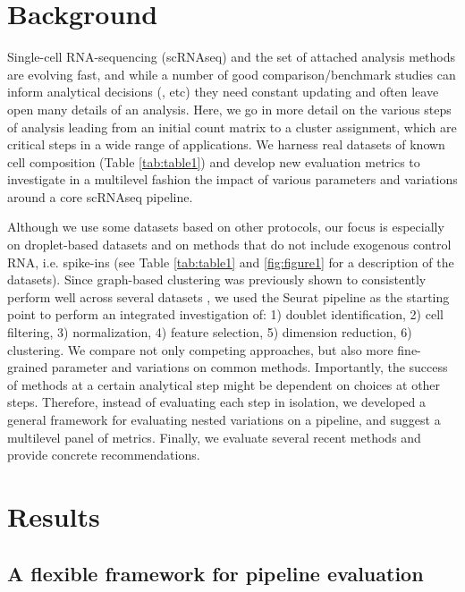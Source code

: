 \documentclass{bmcart}
\begin{document}

\section*{Background}

Single-cell RNA-sequencing (scRNAseq) and the set of attached analysis methods are evolving fast, and while a number of good comparison/benchmark studies can inform analytical decisions (\citealp{duoClustering2018}, etc) they need constant updating and often leave open many details of an analysis. Here, we go in more detail on the various steps of analysis leading from an initial count matrix to a cluster assignment, which are critical steps in a wide range of applications. We harness real datasets of known cell composition (Table \ref{tab:table1}) and develop new evaluation metrics to investigate in a multilevel fashion the impact of various parameters and variations around a core scRNAseq pipeline.

Although we use some datasets based on other protocols, our focus is especially on droplet-based datasets and on methods that do not include exogenous control RNA, i.e. spike-ins (see Table \ref{tab:table1} and \ref{fig:figure1} for a description of the datasets). Since graph-based clustering  \cite{satijaSeurat2015} was previously shown to consistently perform well across several datasets \cite{duoClustering2018,tianMixology2018}, we used the Seurat pipeline as the starting point to perform an integrated investigation of: 1) doublet identification, 2) cell filtering, 3) normalization, 4) feature selection, 5) dimension reduction, 6) clustering. We compare not only competing approaches, but also more fine-grained parameter and variations on common methods. Importantly, the success of methods at a certain analytical step might be dependent on choices at other steps. Therefore, instead of evaluating each step in isolation, we developed a general framework for evaluating nested variations on a pipeline, and suggest a multilevel panel of metrics. Finally, we evaluate several recent methods and provide concrete recommendations.

\section*{Results}

\subsection*{A flexible framework for pipeline evaluation}
\end{document}
